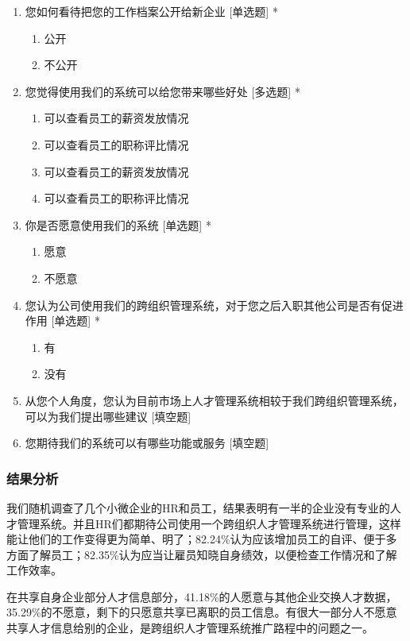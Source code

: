 \documentclass[master]{hduthesis}
\begin{document}
\begin{enumerate}[1.]
\begin{enumerate}
	\end{enumerate}
	\item 您如何看待把您的工作档案公开给新企业 [单选题] *
	\begin{enumerate}
		\item 公开
		\item 不公开
	\end{enumerate}
	\item 您觉得使用我们的系统可以给您带来哪些好处 [多选题] *
	\begin{enumerate}
		\item 可以查看员工的薪资发放情况
		\item 可以查看员工的职称评比情况
		\item 可以查看员工的薪资发放情况
		\item 可以查看员工的职称评比情况
	\end{enumerate}
	\item 你是否愿意使用我们的系统 [单选题] *
	\begin{enumerate}
		\item 愿意
		\item 不愿意
	\end{enumerate}
	\item 您认为公司使用我们的跨组织管理系统，对于您之后入职其他公司是否有促进作用 [单选题] *
	\begin{enumerate}
		\item 有
		\item 没有
	\end{enumerate}
	\item 从您个人角度，您认为目前市场上人才管理系统相较于我们跨组织管理系统，可以为我们提出哪些建议 [填空题]
	\item 您期待我们的系统可以有哪些功能或服务 [填空题]
\end{enumerate}
\subsubsection{结果分析}
我们随机调查了几个小微企业的HR和员工，结果表明有一半的企业没有专业的人才管理系统。并且HR们都期待公司使用一个跨组织人才管理系统进行管理，这样能让他们的工作变得更为简单、明了；82.24\%认为应该增加员工的自评、便于多方面了解员工；82.35\%认为应当让雇员知晓自身绩效，以便检查工作情况和了解工作效率。


在共享自身企业部分人才信息部分，41.18\%的人愿意与其他企业交换人才数据，35.29\%的不愿意，剩下的只愿意共享已离职的员工信息。有很大一部分人不愿意共享人才信息给别的企业，是跨组织人才管理系统推广路程中的问题之一。
\end{document}

